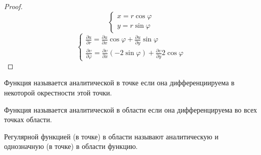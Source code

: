 \begin{proof}
  $$
  \left\{
  \begin{array}{l}
    x = r \cos \varphi \\
    y = r \sin \varphi
  \end{array}
  \right.
  $$
  $$
  \left\{
  \begin{array}{l}
    \frac{\partial u}{\partial r} = \frac{\partial u}{\partial x} \cos \varphi
    + \frac{\partial u}{\partial y} \sin \varphi \\
    \frac{\partial \upsilon}{\partial \varphi} =
    \frac{\partial \upsilon}{\partial x} (-2 \sin \varphi) +
    \frac{\partial \upsilon}{\partial y} 2\cos \varphi
  \end{array}
  \right.
  $$
\end{proof}

\begin{define}
  Функция называется аналитической в точке если она дифференциируема в
  некоторой окрестности этой точки.
\end{define}

\begin{define}
  Функция называется аналитической в области если она дифференцируема во всех
  точках области.
\end{define}

\begin{define}
  Регулярной функцией (в точке) в области называют аналитическую и однозначную
  (в точке) в области функцию.
\end{define}
